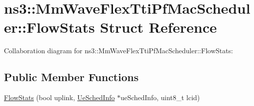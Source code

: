 \hypertarget{structns3_1_1MmWaveFlexTtiPfMacScheduler_1_1FlowStats}{}\section{ns3\+:\+:Mm\+Wave\+Flex\+Tti\+Pf\+Mac\+Scheduler\+:\+:Flow\+Stats Struct Reference}
\label{structns3_1_1MmWaveFlexTtiPfMacScheduler_1_1FlowStats}


Collaboration diagram for ns3\+:\+:Mm\+Wave\+Flex\+Tti\+Pf\+Mac\+Scheduler\+:\+:Flow\+Stats\+:
\subsection*{Public Member Functions}
\begin{DoxyCompactItemize}
\item 
\hyperlink{structns3_1_1MmWaveFlexTtiPfMacScheduler_1_1FlowStats_a5f651810317f175b55f9f7e3f561180a}{Flow\+Stats} (bool uplink, \hyperlink{structns3_1_1MmWaveFlexTtiPfMacScheduler_1_1UeSchedInfo}{Ue\+Sched\+Info} $\ast$ue\+Sched\+Info, uint8\+\_\+t lcid)
\end{DoxyCompactItemize}
